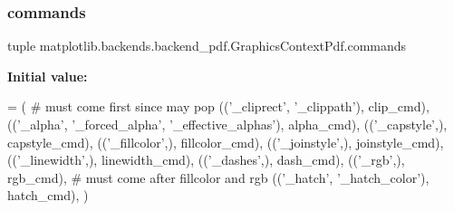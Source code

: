 \mbox{\label{classmatplotlib_1_1backends_1_1backend__pdf_1_1GraphicsContextPdf_a5994b3ceebb8ca86feb327cf79094d8c}} 
\subsubsection{\texorpdfstring{commands}{commands}}
{\footnotesize\ttfamily tuple matplotlib.\+backends.\+backend\+\_\+pdf.\+Graphics\+Context\+Pdf.\+commands\hspace{0.3cm}{\ttfamily [static]}}

{\bfseries Initial value\+:}
\begin{DoxyCode}
=  (
        \textcolor{comment}{# must come first since may pop}
        ((\textcolor{stringliteral}{'\_cliprect'}, \textcolor{stringliteral}{'\_clippath'}), clip\_cmd),
        ((\textcolor{stringliteral}{'\_alpha'}, \textcolor{stringliteral}{'\_forced\_alpha'}, \textcolor{stringliteral}{'\_effective\_alphas'}), alpha\_cmd),
        ((\textcolor{stringliteral}{'\_capstyle'},), capstyle\_cmd),
        ((\textcolor{stringliteral}{'\_fillcolor'},), fillcolor\_cmd),
        ((\textcolor{stringliteral}{'\_joinstyle'},), joinstyle\_cmd),
        ((\textcolor{stringliteral}{'\_linewidth'},), linewidth\_cmd),
        ((\textcolor{stringliteral}{'\_dashes'},), dash\_cmd),
        ((\textcolor{stringliteral}{'\_rgb'},), rgb\_cmd),
        \textcolor{comment}{# must come after fillcolor and rgb}
        ((\textcolor{stringliteral}{'\_hatch'}, \textcolor{stringliteral}{'\_hatch\_color'}), hatch\_cmd),
        )
\end{DoxyCode}
\mbox{\label{classmatplotlib_1_1backends_1_1backend__pdf_1_1GraphicsContextPdf_a5b5056a5bfa05653e5b803bb8387e10a}} 
